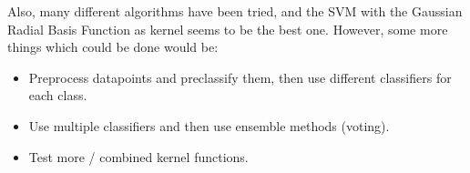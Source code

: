 \documentclass[a4paper, 11pt]{article}
\begin{document}
Also, many different algorithms have been tried, and the SVM with the Gaussian Radial Basis Function as kernel seems to be the best one. However, some more things which could be done would be:
\begin{itemize}
\item Preprocess datapoints and preclassify them, then use different classifiers for each class.
\item Use multiple classifiers and then use ensemble methods (voting).
\item Test more / combined kernel functions.
\end{itemize}
\end{document}
